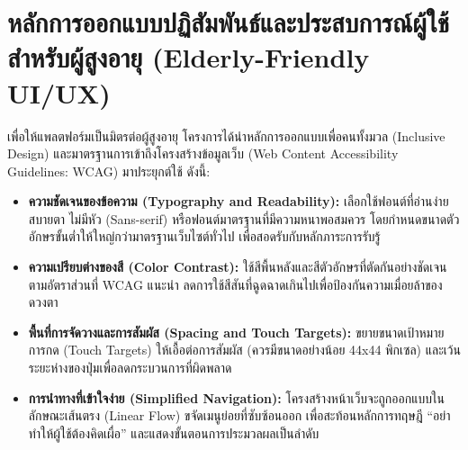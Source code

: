 \section{หลักการออกแบบปฏิสัมพันธ์และประสบการณ์ผู้ใช้สำหรับผู้สูงอายุ (Elderly-Friendly UI/UX)}
เพื่อให้แพลตฟอร์มเป็นมิตรต่อผู้สูงอายุ โครงการได้นำหลักการออกแบบเพื่อคนทั้งมวล (Inclusive Design) \cite{inclusive2022} และมาตรฐานการเข้าถึงโครงสร้างข้อมูลเว็บ (Web Content Accessibility Guidelines: WCAG) \cite{wcag2023, wcag22_2023} มาประยุกต์ใช้ ดังนี้:
\begin{itemize}
    \item \textbf{ความชัดเจนของข้อความ (Typography and Readability):} เลือกใช้ฟอนต์ที่อ่านง่าย สบายตา ไม่มีหัว (Sans-serif) หรือฟอนต์มาตรฐานที่มีความหนาพอสมควร โดยกำหนดขนาดตัวอักษรขั้นต่ำให้ใหญ่กว่ามาตรฐานเว็บไซต์ทั่วไป เพื่อสอดรับกับหลักภาระการรับรู้ \cite{nielsen2000}
    \item \textbf{ความเปรียบต่างของสี (Color Contrast):} ใช้สีพื้นหลังและสีตัวอักษรที่ตัดกันอย่างชัดเจนตามอัตราส่วนที่ WCAG แนะนำ \cite{color_contrast_wcag} ลดการใช้สีสันที่ฉูดฉาดเกินไปเพื่อป้องกันความเมื่อยล้าของดวงตา
    \item \textbf{พื้นที่การจัดวางและการสัมผัส (Spacing and Touch Targets):} ขยายขนาดเป้าหมายการกด (Touch Targets) ให้เอื้อต่อการสัมผัส (ควรมีขนาดอย่างน้อย 44x44 พิกเซล) \cite{mobileux2021} และเว้นระยะห่างของปุ่มเพื่อลดกระบวนการที่ผิดพลาด
    \item \textbf{การนำทางที่เข้าใจง่าย (Simplified Navigation):} โครงสร้างหน้าเว็บจะถูกออกแบบในลักษณะเส้นตรง (Linear Flow) ขจัดเมนูย่อยที่ซับซ้อนออก เพื่อสะท้อนหลักการทฤษฎี “อย่าทำให้ผู้ใช้ต้องคิดเผื่อ” \cite{krug2000} และแสดงขั้นตอนการประมวลผลเป็นลำดับ
\end{itemize}

